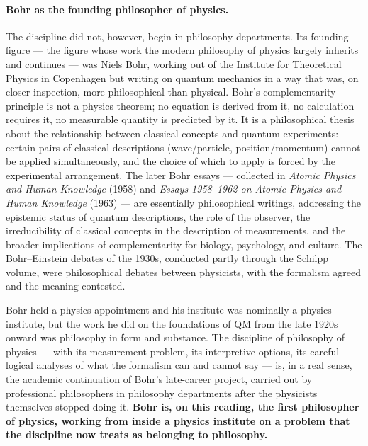 \paragraph{Bohr as the founding philosopher of physics.}
The discipline did not, however, begin in philosophy departments. Its founding figure --- the figure whose work the modern philosophy of physics largely inherits and continues --- was Niels Bohr, working out of the Institute for Theoretical Physics in Copenhagen but writing on quantum mechanics in a way that was, on closer inspection, more philosophical than physical. Bohr's complementarity principle is not a physics theorem; no equation is derived from it, no calculation requires it, no measurable quantity is predicted by it. It is a philosophical thesis about the relationship between classical concepts and quantum experiments: certain pairs of classical descriptions (wave/particle, position/momentum) cannot be applied simultaneously, and the choice of which to apply is forced by the experimental arrangement. The later Bohr essays --- collected in \emph{Atomic Physics and Human Knowledge} (1958) and \emph{Essays 1958--1962 on Atomic Physics and Human Knowledge} (1963) --- are essentially philosophical writings, addressing the epistemic status of quantum descriptions, the role of the observer, the irreducibility of classical concepts in the description of measurements, and the broader implications of complementarity for biology, psychology, and culture. The Bohr--Einstein debates of the 1930s, conducted partly through the Schilpp volume, were philosophical debates between physicists, with the formalism agreed and the meaning contested.

Bohr held a physics appointment and his institute was nominally a physics institute, but the work he did on the foundations of QM from the late 1920s onward was philosophy in form and substance. The discipline of philosophy of physics --- with its measurement problem, its interpretive options, its careful logical analyses of what the formalism can and cannot say --- is, in a real sense, the academic continuation of Bohr's late-career project, carried out by professional philosophers in philosophy departments after the physicists themselves stopped doing it. \textbf{Bohr is, on this reading, the first philosopher of physics, working from inside a physics institute on a problem that the discipline now treats as belonging to philosophy.}

